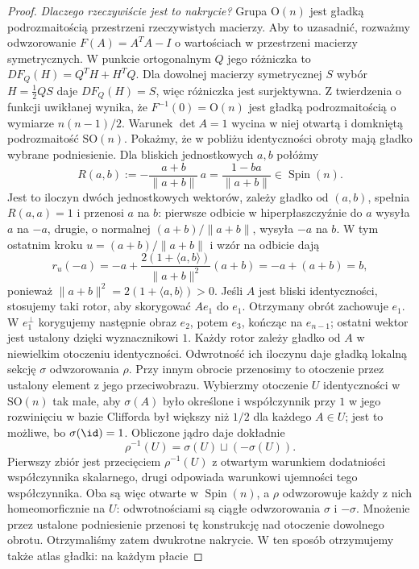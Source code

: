 \begin{proof}
\emph{Dlaczego rzeczywiście jest to nakrycie?}
Grupa $\mathrm O(n)$ jest gładką podrozmaitością
przestrzeni rzeczywistych macierzy. Aby to uzasadnić,
rozważmy odwzorowanie $F(A)=A^TA-I$ o wartościach w
przestrzeni macierzy symetrycznych. W punkcie ortogonalnym
$Q$ jego różniczka to
$DF_Q(H)=Q^TH+H^TQ$. Dla dowolnej macierzy symetrycznej
$S$ wybór $H=\frac12 QS$ daje $DF_Q(H)=S$,
więc różniczka jest surjektywna. Z twierdzenia o funkcji
uwikłanej wynika, że $F^{-1}(0)=\mathrm O(n)$
jest gładką podrozmaitością o wymiarze $n(n-1)/2$.
Warunek $\det A=1$ wycina w niej otwartą i domkniętą
podrozmaitość $\mathrm{SO}(n)$.
Pokażmy, że w pobliżu identyczności obroty mają
gładko wybrane podniesienie. Dla bliskich
jednostkowych $a,b$ połóżmy
\[
 R(a,b):=-\frac{a+b}{\|a+b\|}\,a
       =\frac{1-ba}{\|a+b\|}\in\operatorname{Spin}(n).
\]
Jest to iloczyn dwóch jednostkowych wektorów,
zależy gładko od $(a,b)$, spełnia $R(a,a)=1$
i przenosi $a$ na $b$: pierwsze odbicie w
hiperpłaszczyźnie do $a$ wysyła $a$ na $-a$,
drugie, o normalnej $(a+b)/\|a+b\|$, wysyła
$-a$ na $b$.
W tym ostatnim kroku $u=(a+b)/\|a+b\|$ i wzór na odbicie dają
\[
 r_u(-a)
 =-a+\frac{2(1+\langle a,b\rangle)}{\|a+b\|^2}(a+b)
 =-a+(a+b)=b,
\]
ponieważ $\|a+b\|^2=2(1+\langle a,b\rangle)>0$.
Jeśli $A$ jest bliski identyczności,
stosujemy taki rotor, aby skorygować $Ae_1$ do
$e_1$. Otrzymany obrót zachowuje $e_1$.
W $e_1^\perp$ korygujemy następnie obraz
$e_2$, potem $e_3$, kończąc na $e_{n-1}$;
ostatni wektor jest ustalony dzięki wyznacznikowi
$1$. Każdy rotor zależy gładko od $A$
w niewielkim otoczeniu identyczności.
Odwrotność ich iloczynu daje gładką lokalną
sekcję $\sigma$ odwzorowania $\rho$.
Przy innym obrocie przenosimy to otoczenie
przez ustalony element z jego przeciwobrazu.
Wybierzmy otoczenie $U$ identyczności w $\mathrm{SO}(n)$
tak małe, aby $\sigma(A)$ było określone i współczynnik
przy $1$ w jego rozwinięciu w bazie Clifforda był większy
niż $1/2$ dla każdego $A\in U$; jest to możliwe, bo
$\sigma(\id)=1$. Obliczone jądro daje dokładnie
\[
 \rho^{-1}(U)=\sigma(U)\sqcup(-\sigma(U)).
\]
Pierwszy zbiór jest przecięciem $\rho^{-1}(U)$
z otwartym warunkiem dodatniości współczynnika skalarnego,
drugi odpowiada warunkowi ujemności tego współczynnika.
Oba są więc otwarte w $\operatorname{Spin}(n)$, a $\rho$
odwzorowuje każdy z nich homeomorficznie na $U$:
odwrotnościami są ciągłe odwzorowania $\sigma$ i $-\sigma$.
Mnożenie przez ustalone podniesienie przenosi tę konstrukcję
nad otoczenie dowolnego obrotu. Otrzymaliśmy zatem
dwukrotne nakrycie.
W ten sposób otrzymujemy także atlas gładki: na każdym płacie

\end{proof}
